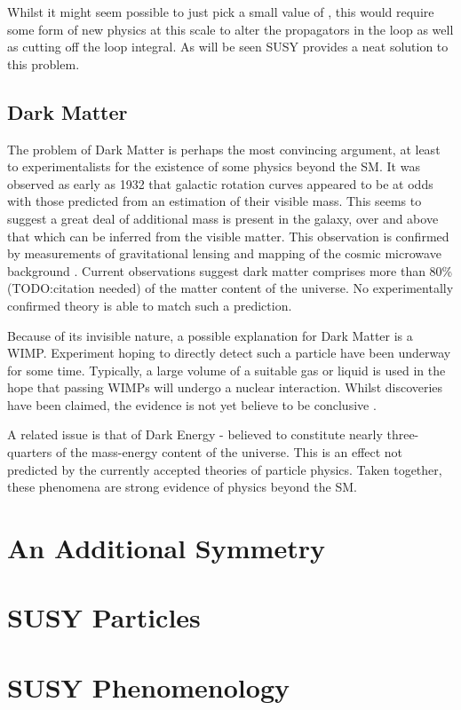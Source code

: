 Whilst it might seem possible to just pick a small value of \LambdaUV, this
would require some form of new physics at this scale to alter the propagators in
the loop as well as cutting off the loop integral. As will be seen \ac{SUSY}
provides a neat solution to this problem.

\subsection{Dark Matter}
The problem of Dark Matter is perhaps the most convincing argument, at least to
experimentalists for the existence of some physics beyond the \ac{SM}. It was
observed as early as 1932 \cite{darkmatter_review} that galactic rotation curves
appeared to be at odds with those predicted from an estimation of their visible
mass. This seems to suggest a great deal of additional mass is present in the
galaxy, over and above that which can be inferred from the visible matter. This
observation is confirmed by measurements of gravitational lensing
\cite{bullet_cluster} and mapping of the cosmic microwave background
\cite{wmap_7year}. Current observations suggest dark matter comprises more than
80\% (TODO:citation needed) of the matter content of the universe. No
experimentally confirmed theory is able to match such a prediction.

Because of its invisible nature, a possible explanation for Dark Matter is a
\acl{WIMP}. Experiment hoping to directly detect such a particle have been
underway for some time. Typically, a large volume of a suitable gas or liquid is
used in the hope that passing \acp{WIMP} will undergo a nuclear
interaction. Whilst discoveries have been claimed, the evidence is not yet
believe to be conclusive \cite{dama_libra}.

A related issue is that of Dark Energy - believed to constitute nearly
three-quarters of the mass-energy content of the universe. This is an effect not
predicted by the currently accepted theories of particle physics. Taken
together, these phenomena are strong evidence of physics beyond the \ac{SM}.

\section{An Additional Symmetry}
\section{\ac{SUSY} Particles}
\section{\ac{SUSY} Phenomenology}
